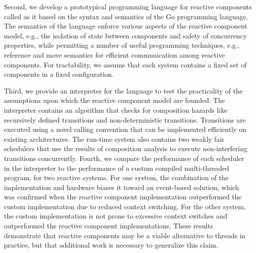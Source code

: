 Second, we develop a prototypical programming language for reactive components called \emph{\rcgo{}} as it based on the syntax and semantics of the Go programming language.
The semantics of the \rcgo{} language enforce various aspects of the reactive component model, e.g., the isolation of state between components and safety of concurrency properties, while permitting a number of useful programming techniques, e.g., reference and move semantics for efficient communication among reactive components.
For tractability, we assume that each system contains a fixed set of components in a fixed configuration.

Third, we provide an interpreter for the \rcgo{} language to test the practicality of the assumptions upon which the reactive component model are founded.
The interpreter contains an algorithm that checks for composition hazards like recursively defined transitions and non-deterministic transitions.
Transitions are executed using a novel calling convention that can be implemented efficiently on existing architectures.
The run-time system also contains two weakly fair schedulers that use the results of composition analysis to execute non-interfering transitions concurrently.
Fourth, we compare the performance of each scheduler in the interpreter to the performance of a custom compiled multi-threaded program, for two reactive systems.
For one system, the combination of the implementation and hardware biases it toward an event-based solution, which was confirmed when the reactive component implementation outperformed the custom implementation due to reduced context switching.
For the other system, the custom implementation is not prone to excessive context switches and outperformed the reactive component implementations.
These results demonstrate that reactive components may be a viable alternative to threads in practice, but that additional work is necessary to generalize this claim.
